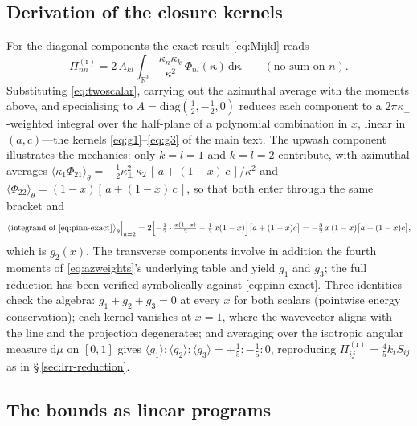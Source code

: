 \documentclass[11pt,a4paper]{article}
\begin{document}
\subsection{Derivation of the closure kernels}\label{app:kernels}

For the diagonal components the exact result \eqref{eq:Mijkl} reads
\begin{equation}
  \Pi^{(\mathrm r)}_{nn}
  = 2\,A_{kl}\int_{\mathbb{R}^3}
    \frac{\kappa_n\kappa_k}{\kappa^2}\,
    \Phi_{nl}(\boldsymbol{\kappa})\,\mathrm{d}\boldsymbol{\kappa}
  \qquad(\text{no sum on }n).
  \label{eq:pinn-exact}
\end{equation}
Substituting \eqref{eq:twoscalar}, carrying out the azimuthal average with
the moments above, and specialising to
$A=\mathrm{diag}(\tfrac12,-\tfrac12,0)$ reduces each component to a
$2\pi\kappa_\perp$-weighted integral over the half-plane of a polynomial
combination in $x$, linear in $(a,c)$---the kernels
\eqref{eq:g1}--\eqref{eq:g3} of the main text. The upwash component
illustrates the mechanics: only $k=l=1$ and $k=l=2$ contribute, with
azimuthal averages
$\langle\kappa_1\Phi_{21}\rangle_\theta
=-\tfrac12\kappa_\perp^2\,\kappa_2\,[\,a+(1-x)\,c\,]/\kappa^2$
and
$\langle\Phi_{22}\rangle_\theta=(1-x)[\,a+(1-x)\,c\,]$, so that both enter
through the same bracket and
\begin{equation}
  \bigl\langle\text{integrand of \eqref{eq:pinn-exact}}\bigr\rangle_\theta
  \Big|_{n=2}
  = 2\Bigl[-\tfrac12\cdot\tfrac{x(1-x)}{2}
           -\tfrac12\,x(1-x)\Bigr]\bigl[a+(1-x)c\bigr]
  = -\tfrac32\,x\,(1-x)\bigl[a+(1-x)c\bigr],
  \label{eq:g2derive}
\end{equation}
which is $g_2(x)$. The transverse components involve in addition the
fourth moments of \eqref{eq:azweights}'s underlying table and yield
$g_1$ and $g_3$; the full reduction has been verified symbolically against
\eqref{eq:pinn-exact}. Three identities check the algebra:
$g_1+g_2+g_3=0$ at every $x$ for both scalars (pointwise energy
conservation); each kernel vanishes at $x=1$, where the wavevector aligns
with the line and the projection degenerates; and averaging over the
isotropic angular measure $\mathrm{d}\mu$ on $[0,1]$ gives
$\langle g_1\rangle:\langle g_2\rangle:\langle g_3\rangle
=+\tfrac15:-\tfrac15:0$, reproducing
$\Pi^{(\mathrm r)}_{ij}=\tfrac45 k_tS_{ij}$ \citep{Crow1968} as in
\S\,\ref{sec:lrr-reduction}.

\subsection{The bounds as linear programs}\label{app:lp}
\end{document}
